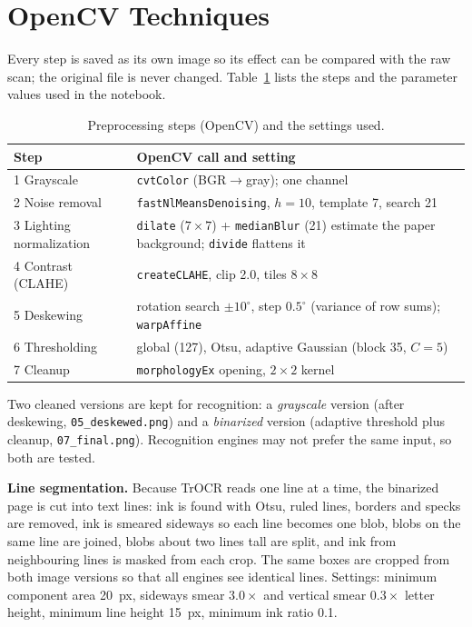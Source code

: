 \documentclass[10pt,twocolumn]{article}
\begin{document}
\section{OpenCV Techniques}
Every step is saved as its own image so its effect can be compared with the raw scan; the original file is never changed. Table~\ref{tab:steps} lists the steps and the parameter values used in the notebook.

\begin{table}[t]
\centering\small
\caption{Preprocessing steps (OpenCV) and the settings used.}\label{tab:steps}
\begin{tabular}{@{}p{}p{}@{}}
\toprule
\textbf{Step} & \textbf{OpenCV call and setting}\\
\midrule
1 Grayscale & \texttt{cvtColor} (BGR$\rightarrow$gray); one channel\\
2 Noise removal & \texttt{fastNlMeansDenoising}, $h{=}10$, template 7, search 21\\
3 Lighting normalization & \texttt{dilate} ($7{\times}7$) + \texttt{medianBlur} (21) estimate the paper background; \texttt{divide} flattens it\\
4 Contrast (CLAHE) & \texttt{createCLAHE}, clip 2.0, tiles $8{\times}8$\\
5 Deskewing & rotation search $\pm10^\circ$, step $0.5^\circ$ (variance of row sums); \texttt{warpAffine}\\
6 Thresholding & global (127), Otsu, adaptive Gaussian (block 35, $C{=}5$)\\
7 Cleanup & \texttt{morphologyEx} opening, $2{\times}2$ kernel\\
\bottomrule
\end{tabular}
\end{table}

Two cleaned versions are kept for recognition: a \emph{grayscale} version (after deskewing, \texttt{05\_\allowbreak{}deskewed.png}) and a \emph{binarized} version (adaptive threshold plus cleanup, \texttt{07\_\allowbreak{}final.png}). Recognition engines may not prefer the same input, so both are tested.

\textbf{Line segmentation.} Because TrOCR reads one line at a time, the binarized page is cut into text lines: ink is found with Otsu, ruled lines, borders and specks are removed, ink is smeared sideways so each line becomes one blob, blobs on the same line are joined, blobs about two lines tall are split, and ink from neighbouring lines is masked from each crop. The same boxes are cropped from both image versions so that all engines see identical lines. Settings: minimum component area 20~px, sideways smear $3.0\times$ and vertical smear $0.3\times$ letter height, minimum line height 15~px, minimum ink ratio 0.1.
\end{document}
